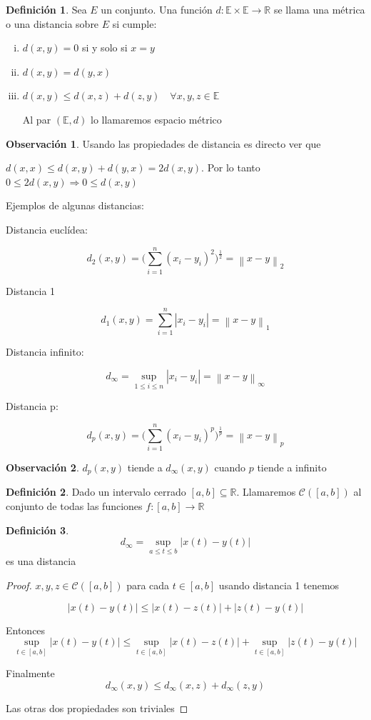 \documentclass[12pt]{article}
\newcommand{\R}{\mathbb{R}}
\newcommand{\E}{\mathbb{E}}
\newcommand{\Ra}{\Rightarrow}
\newcommand{\ra}{\rightarrow}
\newcommand{\norm}[1]{\left\lVert#1\right\rVert}
\theoremstyle{definition}
\newtheorem{definition}{Definición}[section]
\newtheorem*{remark}{Observación}
\begin{document}
\begin{definition}
  Sea $E$ un conjunto. Una función $d: \E \times \E \ra \R$  se llama una métrica o una distancia sobre $E$ si cumple:
  \begin{enumerate}[i.]
    \item $d(x,y) = 0$ si y solo si $x=y$
    \item $d(x,y) = d(y,x)$
    \item $d(x,y) \leq d(x,z) + d(z,y) \quad \forall x,y,z \in \E$

      Al par $(\E , d)$ lo llamaremos espacio métrico
  \end{enumerate}
\end{definition}

\begin{remark}

  Usando las propiedades de distancia es directo ver que 

  $d(x,x) \leq d(x,y) + d(y,x) = 2d(x,y)$. Por lo tanto $0 \leq 2d(x,y) \Ra 0 \leq d(x,y)$
\end{remark}

Ejemplos de algunas distancias:

Distancia euclídea:

$$ d_{2}(x,y) = \biggr(\sum_{i = 1}^{n} (x_{i} - y_{i})^2\biggl)^{\frac{1}{2}} = \norm{x - y}_{2}$$

Distancia 1

$$d_{1}(x,y) = \sum_{i =1}^{n} |x_{i} - y_{i}| = \norm{x - y}_{1} $$

Distancia infinito:

$$d_{\infty} = \sup_{1 \leq i \leq n} |x_{i} - y_{i}| = \norm{x - y}_{\infty}$$

Distancia p:

$$ d_{p}(x,y) = \biggr(\sum_{i = 1}^{n} (x_{i} - y_{i})^p\biggl)^{\frac{1}{p}} = \norm{x - y}_{p}$$


\begin{remark}
  $d_{p}(x,y) $ tiende a $d_{\infty}(x,y)$ cuando $p$ tiende a infinito
\end{remark}

\begin{definition} Dado un intervalo cerrado $[a,b] \subseteq \R$. Llamaremos $\mathcal{C}([a,b])$ al conjunto de todas las funciones $f: [a,b] \ra \R$
\end{definition}
\begin{definition} 
  $$ d_{\infty} = \sup_{a \leq t \leq b} |x(t) - y(t)| $$ es una distancia 

  \begin{proof}
    $x,y,z \in \mathcal{C}([a,b])$ para cada $t \in [a,b]$ usando distancia 1 tenemos 

    $$|x(t) - y(t) | \leq |x(t) - z(t) | + |z(t) - y(t) |$$

    Entonces $$\sup_{t \in [a,b]} |x(t) - y(t) | \leq \sup_{t \in [a,b]} |x(t) - z(t)| +  \sup_{t \in [a,b]} |z(t) - y(t)|  $$

    Finalmente 
    $$ d_{\infty}(x,y) \leq d_{\infty}(x,z) + d_{\infty}(z,y)$$

    Las otras dos propiedades son triviales
  \end{proof}
\end{definition}
\end{document}
